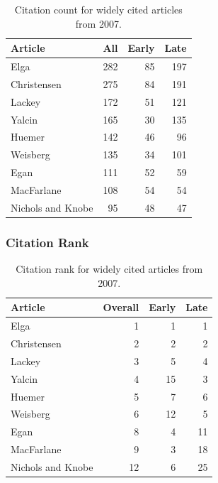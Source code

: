 \documentclass[
  10pt,
  letterpaper,
  DIV=11,
  numbers=noendperiod,
  twoside]{scrartcl}
\begin{document}
\begin{longtable}[]{@{}lrrr@{}}

\caption{\label{tbl-citation-count-2007}Citation count for widely cited
articles from 2007.}

\tabularnewline

\toprule\noalign{}
Article & All & Early & Late \\
\midrule\noalign{}
\endhead
\bottomrule\noalign{}
\endlastfoot
Elga & 282 & 85 & 197 \\
Christensen & 275 & 84 & 191 \\
Lackey & 172 & 51 & 121 \\
Yalcin & 165 & 30 & 135 \\
Huemer & 142 & 46 & 96 \\
Weisberg & 135 & 34 & 101 \\
Egan & 111 & 52 & 59 \\
MacFarlane & 108 & 54 & 54 \\
Nichols and Knobe & 95 & 48 & 47 \\

\end{longtable}

\subsubsection*{Citation Rank}\label{sec-rank-2007}

\begin{longtable}[]{@{}lrrr@{}}

\caption{\label{tbl-citation-rank-2007}Citation rank for widely cited
articles from 2007.}

\tabularnewline

\toprule\noalign{}
Article & Overall & Early & Late \\
\midrule\noalign{}
\endhead
\bottomrule\noalign{}
\endlastfoot
Elga & 1 & 1 & 1 \\
Christensen & 2 & 2 & 2 \\
Lackey & 3 & 5 & 4 \\
Yalcin & 4 & 15 & 3 \\
Huemer & 5 & 7 & 6 \\
Weisberg & 6 & 12 & 5 \\
Egan & 8 & 4 & 11 \\
MacFarlane & 9 & 3 & 18 \\
Nichols and Knobe & 12 & 6 & 25 \\

\end{longtable}
\end{document}

